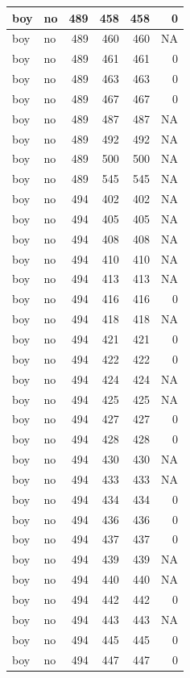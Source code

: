 \documentclass[man]{apa6}
\begin{document}
\begin{tabular}{l|l|r|r|r|r}
\hline
boy & no & 489 & 458 & 458 & 0\\
\hline
boy & no & 489 & 460 & 460 & NA\\
\hline
boy & no & 489 & 461 & 461 & 0\\
\hline
boy & no & 489 & 463 & 463 & 0\\
\hline
boy & no & 489 & 467 & 467 & 0\\
\hline
boy & no & 489 & 487 & 487 & NA\\
\hline
boy & no & 489 & 492 & 492 & NA\\
\hline
boy & no & 489 & 500 & 500 & NA\\
\hline
boy & no & 489 & 545 & 545 & NA\\
\hline
boy & no & 494 & 402 & 402 & NA\\
\hline
boy & no & 494 & 405 & 405 & NA\\
\hline
boy & no & 494 & 408 & 408 & NA\\
\hline
boy & no & 494 & 410 & 410 & NA\\
\hline
boy & no & 494 & 413 & 413 & NA\\
\hline
boy & no & 494 & 416 & 416 & 0\\
\hline
boy & no & 494 & 418 & 418 & NA\\
\hline
boy & no & 494 & 421 & 421 & 0\\
\hline
boy & no & 494 & 422 & 422 & 0\\
\hline
boy & no & 494 & 424 & 424 & NA\\
\hline
boy & no & 494 & 425 & 425 & NA\\
\hline
boy & no & 494 & 427 & 427 & 0\\
\hline
boy & no & 494 & 428 & 428 & 0\\
\hline
boy & no & 494 & 430 & 430 & NA\\
\hline
boy & no & 494 & 433 & 433 & NA\\
\hline
boy & no & 494 & 434 & 434 & 0\\
\hline
boy & no & 494 & 436 & 436 & 0\\
\hline
boy & no & 494 & 437 & 437 & 0\\
\hline
boy & no & 494 & 439 & 439 & NA\\
\hline
boy & no & 494 & 440 & 440 & NA\\
\hline
boy & no & 494 & 442 & 442 & 0\\
\hline
boy & no & 494 & 443 & 443 & NA\\
\hline
boy & no & 494 & 445 & 445 & 0\\
\hline
boy & no & 494 & 447 & 447 & 0\\

\end{tabular}
\end{document}
